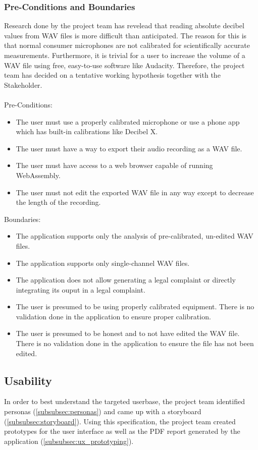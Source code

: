\subsubsection{Pre-Conditions and Boundaries}
\label{subsubsec:pre_conditions_and_boundaries}
Research done by the project team has revelead that reading absolute decibel values from WAV files is more difficult than anticipated.
The reason for this is that normal consumer microphones are not calibrated for scientifically accurate measurements\cite{stackoverflow_spl}. Furthermore, it is trivial for a user
to increase the volume of a WAV file using free, easy-to-use software like Audacity\cite{audacity}\cite{audacity_amplify}. Therefore, the project team has decided 
on a tentative working hypothesis together with the Stakeholder. \\ \\
Pre-Conditions:
\begin{itemize}
    \item The user must use a properly calibrated microphone or use a phone app which has built-in calibrations like Decibel X\cite{decibelx_ios}\cite{decibelx_android}.
    \item The user must have a way to export their audio recording as a WAV file.
    \item The user must have access to a web browser capable of running WebAssembly.
    \item The user must not edit the exported WAV file in any way except to decrease the length of the recording.
\end{itemize}
Boundaries:
\begin{itemize}
    \item The application supports only the analysis of pre-calibrated, un-edited WAV files.
    \item The application supports only single-channel WAV files.
    \item The application does not allow generating a legal complaint or directly integrating its ouput in a legal complaint.
    \item The user is presumed to be using properly calibrated equipment. There is no validation done in the application to ensure proper calibration.
    \item The user is presumed to be honest and to not have edited the WAV file. There is no validation done in the application to ensure the file has not been edited.
\end{itemize}

\subsection{Usability}
In order to best understand the targeted userbase, the project team identified personas (\ref{subsubsec:personas}) and came up with a storyboard (\ref{subsubsec:storyboard}).
Using this specification, the project team created prototypes for the user interface as well as the PDF report generated by the application (\ref{subsubsec:ux_prototyping}).

